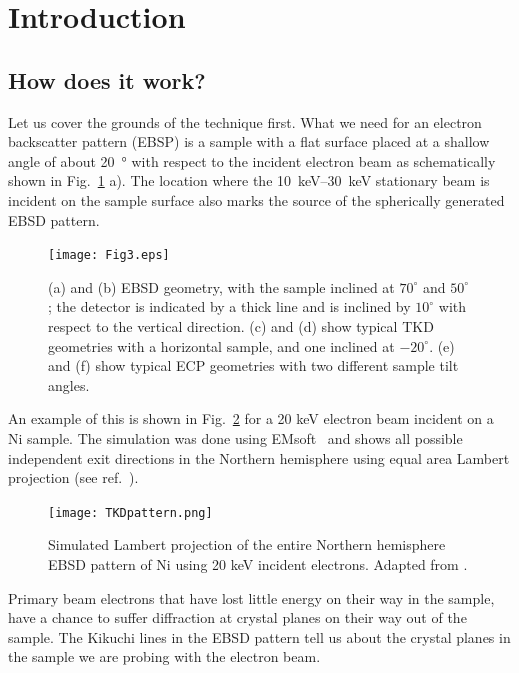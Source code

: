 \section{Introduction}

\subsection{How does it work?}
\label{sec:EBSD}

Let us cover the grounds of the technique first. What we need for an electron backscatter pattern (EBSP) is a sample with a flat surface placed at a shallow angle of about \SI{20}{\degree} with respect to the incident electron  beam as schematically shown in Fig.~\ref{fig:geometries} a). The location where the \SIrange{10}{30}{\kilo \electronvolt} stationary beam is incident on  the sample surface also marks the source of the spherically generated EBSD pattern. 

\begin{figure}[ht]
\centering
\texttt{[image: Fig3.eps]}
\caption[EBSD, TKD and ECP set-up geometry.]{(a) and (b) EBSD geometry, with the sample inclined at $70^{\circ}$ and $50^{\circ}$; the detector is indicated by a thick line and is inclined by $10^{\circ}$ with respect to the vertical direction. (c) and (d) show typical TKD geometries with a horizontal sample, and one inclined at $-20^{\circ}$. (e) and (f) show typical ECP geometries with two different sample tilt angles.}
\label{fig:geometries}
\end{figure}

An example of this is shown in Fig.~\ref{fig:tkspatter} for a 20 keV electron beam incident on a Ni sample. The simulation was done using EMsoft~\cite{EMsoft} and shows all possible independent exit directions in the Northern hemisphere using equal area Lambert projection (see ref.~\cite{degraef2013e}). 

\begin{figure}[ht]
\centering
\texttt{[image: TKDpattern.png]}
\caption[EBSD pattern of Ni northern hemisphere.]{Simulated  Lambert projection of the entire Northern hemisphere  EBSD pattern of Ni using 20 keV incident electrons. Adapted from \cite{PascalTKD}.}
\label{fig:tkspatter}
\end{figure}


Primary beam electrons that have lost little energy on their way in the sample, have a chance to suffer diffraction at crystal planes on their way out of the sample. The Kikuchi lines in the EBSD pattern tell us about the crystal planes in the sample we are probing with the electron beam. 


